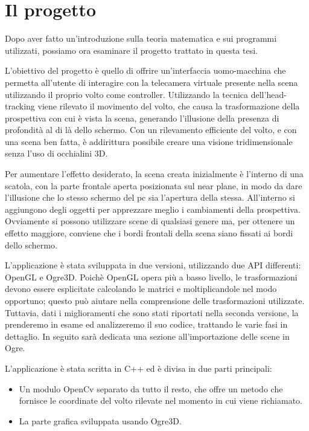 \chapter{Il progetto}

Dopo aver fatto un'introduzione sulla teoria matematica e sui programmi utilizzati, possiamo ora esaminare il progetto trattato in questa tesi.

L'obiettivo del progetto è quello di offrire un'interfaccia uomo-macchina che permetta all'utente di interagire con la telecamera virtuale presente nella scena utilizzando il proprio volto come controller. Utilizzando la tecnica dell'head-tracking viene rilevato il movimento del volto, che causa la trasformazione della prospettiva con cui è vista la scena, generando l'illusione della presenza di profondità al di là dello schermo. Con un rilevamento efficiente del volto, e con una scena ben fatta, è addirittura possibile creare una visione tridimensionale senza l'uso di occhialini 3D.

Per aumentare l'effetto desiderato, la scena creata inizialmente è l'interno di una scatola, con la parte frontale aperta posizionata sul near plane, in modo da dare l'illusione che lo stesso schermo del pc sia l'apertura della stessa. All'interno si aggiungono degli oggetti per apprezzare meglio i cambiamenti della prospettiva. Ovviamente si possono utilizzare scene di qualsiasi genere ma, per ottenere un effetto maggiore, conviene che i bordi frontali della scena siano fissati ai bordi dello schermo.

L'applicazione è stata sviluppata in due versioni, utilizzando due API differenti: OpenGL e Ogre3D.
Poichè OpenGL opera più a basso livello, le trasformazioni devono essere esplicitate calcolando le matrici e moltiplicandole nel modo opportuno; questo può aiutare nella comprensione delle trasformazioni utilizzate. Tuttavia, dati i miglioramenti che sono stati riportati nella seconda versione, la prenderemo in esame ed analizzeremo il suo codice, trattando le varie fasi in dettaglio.
In seguito sarà dedicata una sezione all'importazione delle scene in Ogre.

L'applicazione è stata scritta in C++ ed è divisa in due parti principali:
\begin{itemize}
\item Un modulo OpenCv separato da tutto il resto, che offre un metodo che fornisce le coordinate del volto rilevate nel momento in cui viene richiamato.
\item La parte grafica sviluppata usando Ogre3D.
\end{itemize}


